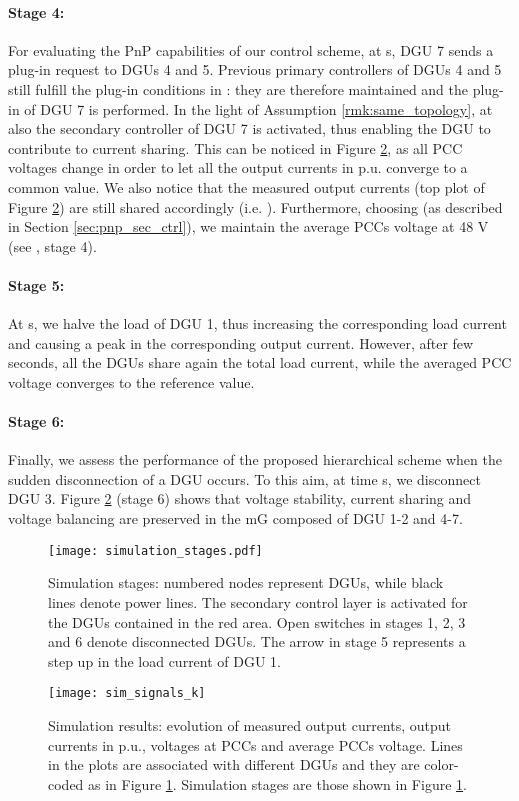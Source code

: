 \documentclass[a4paper]{article}
\theoremstyle{plain}
\begin{document}
\paragraph{Stage 4:} For evaluating the PnP capabilities of our control scheme, at  s, DGU 7 sends a plug-in request to DGUs
4 and 5. Previous primary controllers of DGUs 4 and 5
still fulfill the plug-in conditions in \cite{tucci2015decentralized}: they are therefore maintained and the plug-in of DGU 7 is performed. In the light of Assumption \ref{rmk:same_topology}, at  also the secondary controller of DGU 7 is activated, thus enabling the DGU to 
	contribute to current sharing. This can be noticed in Figure
\ref{fig:sim_complete_1}, as all PCC voltages change in order
to let all the output currents in p.u. converge to a common
value. We also notice that the measured output currents (top plot of Figure \ref{fig:sim_complete_1}) are still shared accordingly (i.e. ). Furthermore, choosing  (as described in
Section \ref{sec:pnp_sec_ctrl}), we maintain the average PCCs voltage at 48 V (see , stage 4). 

\paragraph{Stage 5:} At  s, we halve the load of DGU 1,
thus increasing the corresponding load current  and causing a
peak in the corresponding output current. However, after few seconds,
all the DGUs share again the total load current, while the averaged PCC voltage converges to the reference value. 

\paragraph{Stage 6:}  Finally, we assess the performance of the proposed hierarchical scheme when the sudden disconnection of a DGU occurs. To this aim, at time  s, we disconnect DGU 3. Figure \ref{fig:sim_complete_1} (stage 6) shows that voltage stability, current sharing and voltage balancing are preserved in the mG composed of DGU 1-2 and 4-7.


\begin{figure}
	\centering
	\texttt{[image: simulation\_stages.pdf]}
	\caption{Simulation stages: numbered nodes represent DGUs, while black lines denote power lines. The secondary control layer is activated for the DGUs contained in the red area. Open switches in stages 1, 2, 3 and 6 denote disconnected DGUs. The arrow in stage 5 represents a step up in the load current of DGU 1.}
	\label{fig:sim_stages}
\end{figure}
\begin{figure}
	\centering
	\texttt{[image: sim\_signals\_k]}
	\caption{Simulation results: evolution of measured output currents, output currents in p.u., 
		voltages at PCCs and average PCCs voltage. Lines in the
		plots are associated with different DGUs and they are color-coded as in Figure \ref{fig:sim_stages}. Simulation stages are those shown in Figure \ref{fig:sim_stages}.}
	\label{fig:sim_complete_1}
\end{figure}
\end{document}
